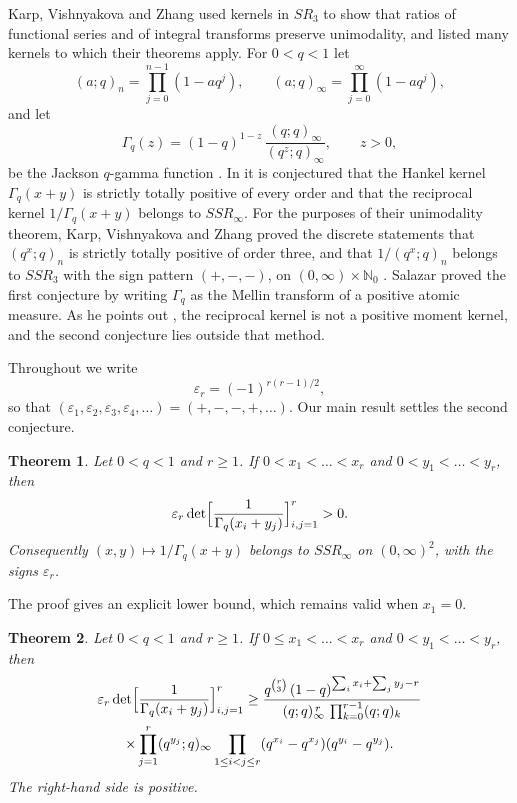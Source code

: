 \documentclass{amsart}
\newtheorem{theorem}{Theorem}[section]
\theoremstyle{remark}
\numberwithin{equation}{section}
\newcommand{\N}{\mathbb{N}}
\begin{document}
Karp, Vishnyakova and Zhang \cite{KVZ} used kernels in $SR_3$ to show that ratios of functional series and of integral transforms preserve unimodality, and listed many kernels to which their theorems apply. For $0<q<1$ let
\[
(a;q)_n=\prod_{j=0}^{n-1}(1-aq^j),\qquad (a;q)_\infty=\prod_{j=0}^{\infty}(1-aq^j),
\]
and let
\begin{equation}\label{eq:Gq}
\Gamma_q(z)=(1-q)^{1-z}\,\frac{(q;q)_\infty}{(q^z;q)_\infty},\qquad z>0,
\end{equation}
be the Jackson $q$-gamma function \cite[\S5.18(ii)]{DLMF}. In \cite[Section~3, Examples~7 and~8]{KVZ} it is conjectured that the Hankel kernel $\Gamma_q(x+y)$ is strictly totally positive of every order and that the reciprocal kernel $1/\Gamma_q(x+y)$ belongs to $SSR_\infty$. For the purposes of their unimodality theorem, Karp, Vishnyakova and Zhang proved the discrete statements that $(q^x;q)_n$ is strictly totally positive of order three, and that $1/(q^x;q)_n$ belongs to $SSR_3$ with the sign pattern $(+,-,-)$, on $(0,\infty)\times\N_0$ \cite[Lemmas~A.1 and~A.2]{KVZ}. Salazar \cite[Theorem~4.1]{Salazar} proved the first conjecture by writing $\Gamma_q$ as the Mellin transform of a positive atomic measure. As he points out \cite[Remark~4.2]{Salazar}, the reciprocal kernel is not a positive moment kernel, and the second conjecture lies outside that method.

Throughout we write
\[
\varepsilon_r=(-1)^{r(r-1)/2},
\]
so that $(\varepsilon_1,\varepsilon_2,\varepsilon_3,\varepsilon_4,\dots)=(+,-,-,+,\dots)$. Our main result settles the second conjecture.

\begin{theorem}\label{thm:main}
Let $0<q<1$ and $r\ge1$. If $0<x_1<\dots<x_r$ and $0<y_1<\dots<y_r$, then
\[
\varepsilon_r\det\Bigl[\frac{1}{\Gamma_q(x_i+y_j)}\Bigr]_{i,j=1}^r>0.
\]
Consequently $(x,y)\mapsto 1/\Gamma_q(x+y)$ belongs to $SSR_\infty$ on $(0,\infty)^2$, with the signs $\varepsilon_r$.
\end{theorem}

The proof gives an explicit lower bound, which remains valid when $x_1=0$.

\begin{theorem}\label{thm:bound}
Let $0<q<1$ and $r\ge1$. If $0\le x_1<\dots<x_r$ and $0<y_1<\dots<y_r$, then
\begin{multline}\label{eq:bound}
\varepsilon_r\det\Bigl[\frac{1}{\Gamma_q(x_i+y_j)}\Bigr]_{i,j=1}^r
\ge \frac{q^{\binom r3}\,(1-q)^{\sum_i x_i+\sum_j y_j-r}}{(q;q)_\infty^{\,r}\,\prod_{k=0}^{r-1}(q;q)_k}
\\
\times\prod_{j=1}^r(q^{y_j};q)_\infty
\prod_{1\le i<j\le r}(q^{x_i}-q^{x_j})(q^{y_i}-q^{y_j}).
\end{multline}
The right-hand side is positive.
\end{theorem}
\end{document}
